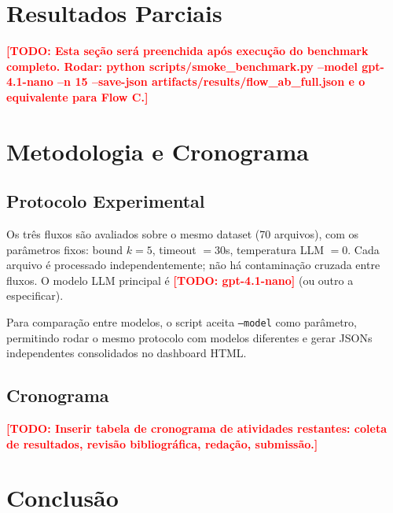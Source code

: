 \documentclass[conference]{IEEEtran}
\newcommand{\todo}[1]{\textcolor{red}{\textbf{[TODO: #1]}}}
\begin{document}
\section{Resultados Parciais}
\label{sec:resultados}

\todo{Esta seção será preenchida após execução do benchmark completo.
      Rodar: python scripts/smoke\_benchmark.py --model gpt-4.1-nano --n 15 --save-json artifacts/results/flow\_ab\_full.json
      e o equivalente para Flow C.}

%

\section{Metodologia e Cronograma}
\label{sec:metodologia}

\subsection{Protocolo Experimental}

Os três fluxos são avaliados sobre o mesmo dataset (70 arquivos),
com os parâmetros fixos: bound $k = 5$, timeout $= 30$s,
temperatura LLM $= 0$.
Cada arquivo é processado independentemente; não há contaminação
cruzada entre fluxos.
O modelo LLM principal é \todo{gpt-4.1-nano} (ou outro a especificar).

Para comparação entre modelos, o script aceita \texttt{--model} como
parâmetro, permitindo rodar o mesmo protocolo com modelos diferentes
e gerar JSONs independentes consolidados no dashboard HTML.

\subsection{Cronograma}

\todo{Inserir tabela de cronograma de atividades restantes:
      coleta de resultados, revisão bibliográfica, redação, submissão.}

\section{Conclusão}
\label{sec:conclusao}
\end{document}
